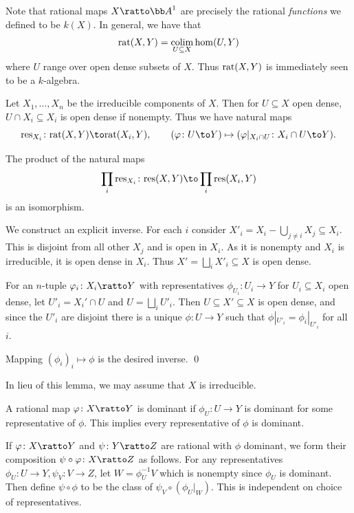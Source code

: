Note that rational maps $X\ratto\bA^1$ are precisely the rational {\it functions\/} we defined to be $k(X)$.
In general, we have that
$$ {\rm rat}(X,Y) = \mathop{\rm colim}\limits_{U\subseteq X}\hom(U,Y) $$
where $U$ range over open dense subsets of $X$.
Thus ${\rm rat}(X,Y)$ is immediately seen to be a $k$-algebra.

Let $X_1,\dots,X_n$ be the irreducible components of $X$.
Then for $U\subseteq X$ open dense, $U\cap X_i\subseteq X_i$ is open dense if nonempty.
Thus we have natural maps
$$ \res_{X_i} \colon \rat(X,Y) \to \rat(X_i,Y),\qquad (\phi\colon U\to Y) \mapsto (\phi|_{X_i\cap U}\colon X_i\cap U\to Y) . $$

\blemm

    The product of the natural maps
    $$ \prod_i\res_{X_i} \colon \res(X,Y) \to \prod_i\res(X_i,Y) $$
    is an isomorphism.

\elemm

\bproof

    We construct an explicit inverse.
    For each $i$ consider $X'_i=X_i-\bigcup_{j\neq i}X_j\subseteq X_i$.
    This is disjoint from all other $X_j$ and is open in $X_i$.
    As it is nonempty and $X_i$ is irreducible, it is open dense in $X_i$.
    Thus $X'=\bigsqcup_i X'_i\subseteq X$ is open dense.

    For an $n$-tuple $\phi_i\colon X_i\ratto Y$ with representatives $\phi_{U_i}\colon U_i\to Y$ for $U_i\subseteq X_i$
    open dense, let $U'_i=X_i'\cap U$ and $U=\bigsqcup_iU'_i$.
    Then $U\subseteq X'\subseteq X$ is open dense, and since the $U'_i$ are disjoint there is a unique $\phi\colon U\to Y$
    such that $\phi|_{U'_i}=\phi_i|_{U'_i}$ for all $i$.

    Mapping $(\phi_i)_i\mapsto\phi$ is the desired inverse.
    \qed

\eproof

In lieu of this lemma, we may assume that $X$ is irreducible.

\bdefn

    A rational map $\phi\colon X\ratto Y$ is {\emphcolor dominant} if $\phi_U\colon U\to Y$ is dominant for some representative
    of $\phi$.
    This implies every representative of $\phi$ is dominant.

    If $\phi\colon X\ratto Y$ and $\psi\colon Y\ratto Z$ are rational with $\phi$ dominant, we form their composition
    $\psi\circ\phi\colon X\ratto Z$ as follows.
    For any representatives $\phi_U\colon U\to Y,\psi_V\colon V\to Z$, let $W=\phi_U^{-1}V$ which is nonempty since $\phi_U$
    is dominant.
    Then define $\psi\circ\phi$ to be the class of $\psi_V\circ(\phi_U|_W)$.
    This is independent on choice of representatives.

